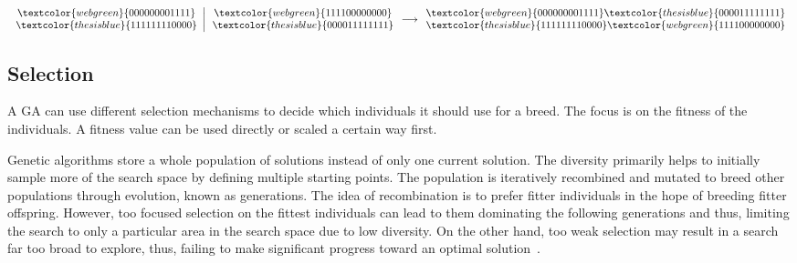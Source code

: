 \documentclass[paper=a4,%
  twoside,%
  BCOR4mm,%
  abstract=true,%
  toc=bibliography,%
  chapterprefix=true,%
  toc=bibliographynumbered,%
  open=right,%
  english,%
  pagesize=pdftex]{scrreprt}
\begin{document}
\[
\left.\begin{array}{c}
\textcolor{webgreen}{000000001111} \\  %
\textcolor{thesisblue}{111111110000} %
\end{array}\right|
\begin{array}{c}
\textcolor{webgreen}{111100000000} \\  %
\textcolor{thesisblue}{000011111111} %
\end{array} \longrightarrow
\begin{array}{c}
\textcolor{webgreen}{000000001111}\textcolor{thesisblue}{000011111111} \\  %
\textcolor{thesisblue}{111111110000}\textcolor{webgreen}{111100000000} %
\end{array}
\]


\subsection{Selection}
\label{sec:background-selection}
A \ac{GA} can use different selection mechanisms to decide which individuals it should use for a breed. The focus is on the fitness of the individuals. A fitness value can be used directly or scaled a certain way first.

Genetic algorithms store a whole population of solutions instead of only one current solution. The diversity primarily helps to initially sample more of the search space by defining multiple starting points. The population is iteratively recombined and mutated to breed other populations through evolution, known as generations. The idea of recombination is to prefer fitter individuals in the hope of breeding fitter offspring. However, too focused selection on the fittest individuals can lead to them dominating the following generations and thus, limiting the search to only a particular area in the search space due to low diversity. On the other hand, too weak selection may result in a search far too broad to explore, thus, failing to make significant progress toward an optimal solution~\cite{McMinn_2004}.
\end{document}
